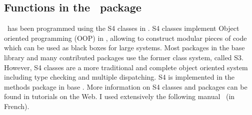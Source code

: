 \subsection{Functions in the \npde~package} \label{sec:npde.methods}

\hskip 18pt \npde~has been programmed using the S4 classes in \R. S4 classes implement Object oriented programming 
(OOP) in \R, allowing to construct modular pieces of code which can be used as black boxes for large systems. Most 
packages in the base library and many contributed packages use the former class system, called S3. However, S4 
classes are a more traditional and complete object oriented system including type checking and multiple 
dispatching. S4 is implemented in the methods package in base \R. More information on S4 classes and \R packages 
can be found in tutorials on the Web. I used extensively the following manual~\cite{Genolini} (in French).

